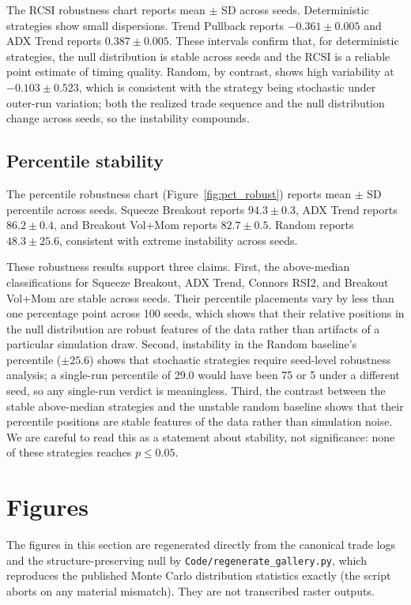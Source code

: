 \documentclass[preprint,12pt]{elsarticle}
\theoremstyle{definition}
\begin{document}
The RCSI robustness chart reports mean $\pm$ SD across seeds. Deterministic strategies show small dispersions. Trend Pullback reports $-0.361 \pm 0.005$ and ADX Trend reports $0.387 \pm 0.005$. These intervals confirm that, for deterministic strategies, the null distribution is stable across seeds and the RCSI is a reliable point estimate of timing quality. Random, by contrast, shows high variability at $-0.103 \pm 0.523$, which is consistent with the strategy being stochastic under outer-run variation; both the realized trade sequence and the null distribution change across seeds, so the instability compounds.

\subsection{Percentile stability}

The percentile robustness chart (Figure~\ref{fig:pct_robust}) reports mean $\pm$ SD percentile across seeds. Squeeze Breakout reports $94.3 \pm 0.3$, ADX Trend reports $86.2 \pm 0.4$, and Breakout Vol+Mom reports $82.7 \pm 0.5$. Random reports $48.3 \pm 25.6$, consistent with extreme instability across seeds.

These robustness results support three claims. First, the above-median classifications for Squeeze Breakout, ADX Trend, Connors RSI2, and Breakout Vol+Mom are stable across seeds. Their percentile placements vary by less than one percentage point across 100 seeds, which shows that their relative positions in the null distribution are robust features of the data rather than artifacts of a particular simulation draw. Second, instability in the Random baseline's percentile ($\pm 25.6$) shows that stochastic strategies require seed-level robustness analysis; a single-run percentile of 29.0 would have been 75 or 5 under a different seed, so any single-run verdict is meaningless. Third, the contrast between the stable above-median strategies and the unstable random baseline shows that their percentile positions are stable features of the data rather than simulation noise. We are careful to read this as a statement about stability, not significance: none of these strategies reaches $p\le0.05$.

\section{Figures}
\label{sec:figures-gallery}

The figures in this section are regenerated directly from the canonical trade logs and the structure-preserving null by \texttt{Code/regenerate\_gallery.py}, which reproduces the published Monte Carlo distribution statistics exactly (the script aborts on any material mismatch). They are not transcribed raster outputs.
\end{document}
